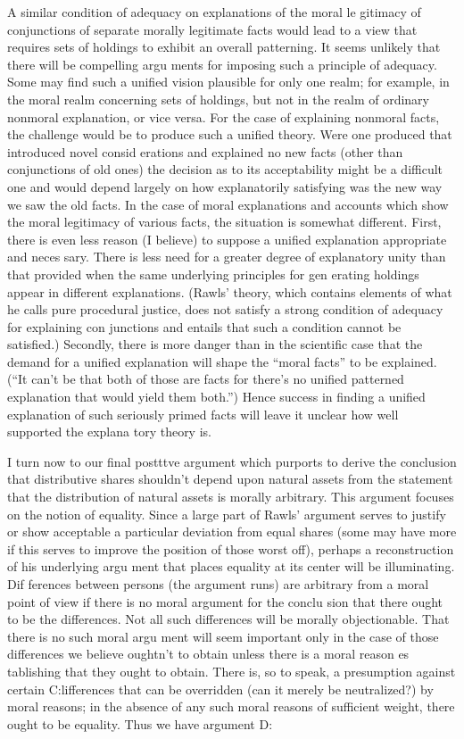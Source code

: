\documentclass[11pt,openany]{book}
\begin{document}
A similar condition of adequacy on explanations of the moral le gitimacy of conjunctions of separate morally legitimate facts would lead to a view that requires sets of holdings to exhibit an overall patterning. It seems unlikely that there will be compelling argu ments for imposing such a principle of adequacy. Some may find such a unified vision plausible for only one realm; for example, in the moral realm concerning sets of holdings, but not in the realm of ordinary nonmoral explanation, or vice versa. For the case of explaining nonmoral facts, the challenge would be to produce such a unified theory. Were one produced that introduced novel consid erations and explained no new facts (other than conjunctions of old ones) the decision as to its acceptability might be a difficult one and would depend largely on how explanatorily satisfying was the new way we saw the old facts. In the case of moral explanations and accounts which show the moral legitimacy of various facts, the situation is somewhat different. First, there is even less reason (I believe) to suppose a unified explanation appropriate and neces sary. There is less need for a greater degree of explanatory unity than that provided when the same underlying principles for gen erating holdings appear in different explanations. (Rawls' theory, which contains elements of what he calls pure procedural justice, does not satisfy a strong condition of adequacy for explaining con junctions and entails that such a condition cannot be satisfied.) Secondly, there is more danger than in the scientific case that the demand for a unified explanation will shape the ``moral facts'' to be explained. (``It can't be that both of those are facts for there's no unified patterned explanation that would yield them both.'') Hence success in finding a unified explanation of such seriously primed facts will leave it unclear how well supported the explana tory theory is. 

I turn now to our final postttve argument which purports to derive the conclusion that distributive shares shouldn't depend upon natural assets from the statement that the distribution of natural assets is morally arbitrary. This argument focuses on the notion of equality. Since a large part of Rawls' argument serves to justify or show acceptable a particular deviation from equal shares (some may have more if this serves to improve the position of those worst off), perhaps a reconstruction of his underlying argu ment that places equality at its center will be illuminating. Dif ferences between persons (the argument runs) are arbitrary from a moral point of view if there is no moral argument for the conclu sion that there ought to be the differences. Not all such differences will be morally objectionable. That there is no such moral argu ment will seem important only in the case of those differences we believe oughtn't to obtain unless there is a moral reason es tablishing that they ought to obtain. There is, so to speak, a presumption against certain C:lifferences that can be overridden (can it merely be neutralized?) by moral reasons; in the absence of any such moral reasons of sufficient weight, there ought to be equality. Thus we have argument D: 
\end{document}

